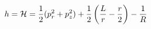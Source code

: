 \documentclass[preview]{standalone}
\begin{document}
\begin{align*}
h =\mathcal{H}=\frac{1}{2}(p_r^2+p_z^2)+\frac{1}{2}\left({ L \over r}-\frac{r}{2}\right)-\frac{1}{R}
\end{align*}
\end{document}
